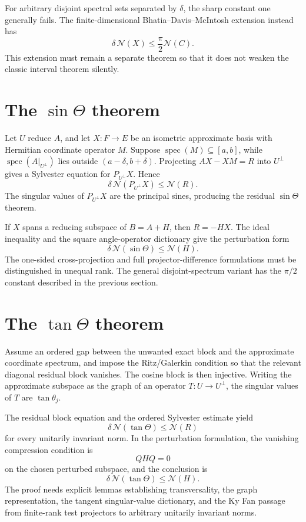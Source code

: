\documentclass[11pt]{article}
\newcommand{\Nn}{\mathcal N}
\newcommand{\spec}{\operatorname{spec}}
\theoremstyle{remark}
\begin{document}
For arbitrary disjoint spectral sets separated by \(\delta\), the sharp
constant one generally fails.  The finite-dimensional Bhatia--Davis--McIntosh
extension instead has
\[
  \delta\,\Nn(X)\le \frac{\pi}{2}\Nn(C).
\]
This extension must remain a separate theorem so that it does not weaken the
classic interval theorem silently.

\section{The \texorpdfstring{$\sin\Theta$}{sin Theta} theorem}

Let \(U\) reduce \(A\), and let \(X:F\to E\) be an isometric approximate
basis with Hermitian coordinate operator \(M\).  Suppose
\(\spec(M)\subseteq[a,b]\), while
\(\spec(A|_{U^\perp})\) lies outside
\((a-\delta,b+\delta)\).  Projecting
\(AX-XM=R\) into \(U^\perp\) gives a Sylvester equation for
\(P_{U^\perp}X\).  Hence
\[
  \delta\,\Nn(P_{U^\perp}X)\le\Nn(R).
\]
The singular values of \(P_{U^\perp}X\) are the principal sines, producing the
residual \(\sin\Theta\) theorem.

If \(X\) spans a reducing subspace of \(B=A+H\), then
\(R=-HX\).  The ideal inequality and the square angle-operator dictionary give
the perturbation form
\[
  \delta\,\Nn(\sin\Theta)\le\Nn(H).
\]
The one-sided cross-projection and full projector-difference formulations must
be distinguished in unequal rank.  The general disjoint-spectrum variant has
the \(\pi/2\) constant described in the previous section.

\section{The \texorpdfstring{$\tan\Theta$}{tan Theta} theorem}

Assume an ordered gap between the unwanted exact block and the approximate
coordinate spectrum, and impose the Ritz/Galerkin condition so that the
relevant diagonal residual block vanishes.  The cosine block is then injective.
Writing the approximate subspace as the graph of an operator \(T:U\to U^\perp\),
the singular values of \(T\) are \(\tan\theta_j\).

The residual block equation and the ordered Sylvester estimate yield
\[
  \delta\,\Nn(\tan\Theta)\le\Nn(R)
\]
for every unitarily invariant norm.  In the perturbation formulation, the
vanishing compression condition is
\[
  QHQ=0
\]
on the chosen perturbed subspace, and the conclusion is
\[
  \delta\,\Nn(\tan\Theta)\le\Nn(H).
\]
The proof needs explicit lemmas establishing transversality, the graph
representation, the tangent singular-value dictionary, and the Ky Fan passage
from finite-rank test projectors to arbitrary unitarily invariant norms.
\end{document}
